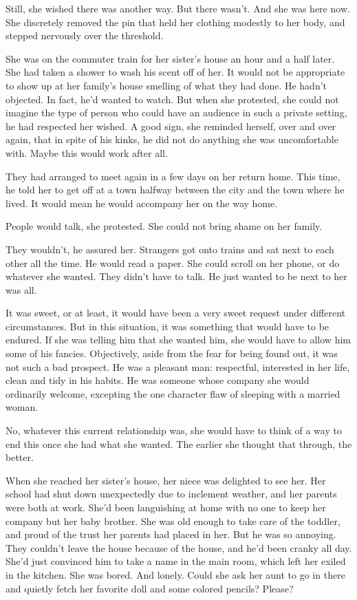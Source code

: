 \documentclass{article}
\begin{document}
Still, she wished there was another way. But there wasn't. And she was here now. She discretely removed the pin that held her clothing modestly to her body, and stepped nervously over the threshold. 

She was on the commuter train for her sister's house an hour and a half later. She had taken a shower to wash his scent off of her. It would not be appropriate to show up at her family's house smelling of what they had done. He hadn't objected. In fact, he'd wanted to watch. But when she protested, she could not imagine the type of person who could have an audience in such a private setting, he had respected her wished. A good sign, she reminded herself, over and over again, that in spite of his kinks, he did not do anything she was uncomfortable with. Maybe this would work after all. 

They had arranged to meet again in a few days on her return home. This time, he told her to get off at a town halfway between the city and the town where he lived. It would mean he would accompany her on the way home. 

People would talk, she protested. She could not bring shame on her family. 

They wouldn't, he assured her. Strangers got onto trains and sat next to each other all the time. He would read a paper. She could scroll on her phone, or do whatever she wanted. They didn't have to talk. He just wanted to be next to her was all.

It was sweet, or at least, it would have been a very sweet request under different circumstances. But in this situation, it was something that would have to be endured. If she was telling him that she wanted him, she would have to allow him some of his fancies. Objectively, aside from the fear for being found out, it was not such a bad prospect. He was a pleasant man: respectful, interested in her life, clean and tidy in his habits. He was someone whose company she would ordinarily welcome, excepting the one character flaw of sleeping with a married woman. 

No, whatever this current relationship was, she would have to think of a way to end this once she had what she wanted. The earlier she thought that through, the better.

When she reached her sister's house, her niece was delighted to see her. Her school had shut down unexpectedly due to inclement weather, and her parents were both at work. She'd been languishing at home with no one to keep her company but her baby brother. She was old enough to take care of the toddler, and proud of the trust her parents had placed in her. But he was so annoying. They couldn't leave the house because of the house, and he'd been cranky all day. She'd just convinced him to take a name in the main room, which left her exiled in the kitchen. She was bored. And lonely. Could she ask her aunt to go in there and quietly fetch her favorite doll and some colored pencils? Please?
\end{document}

